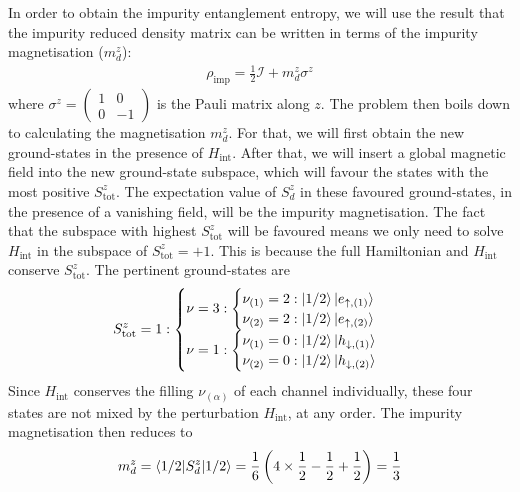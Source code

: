 \documentclass{revtex4-2}
\begin{document}
In order to obtain the impurity entanglement entropy, we will use the result that the impurity reduced density matrix can be written in terms of the impurity magnetisation (\(m_d^z\)):
\begin{equation}\begin{aligned}
	\rho_\text{imp} = \frac{1}{2}\mathcal{I} + m_d^z \sigma^z 
\end{aligned}\end{equation}
where \(\sigma^z = \begin{pmatrix} 1 & 0 \\ 0 & -1 \end{pmatrix} \) is the Pauli matrix along \(z\). The problem then boils down to calculating the magnetisation \(m_d^z\). For that, we will first obtain the new ground-states in the presence of \(H_\text{int}\). After that, we will insert a global magnetic field into the new ground-state subspace, which will favour the states with the most positive \(S_\text{tot}^z\). The expectation value of \(S_d^z\) in these favoured ground-states, in the presence of a vanishing field, will be the impurity magnetisation. The fact that the subspace with highest \(S_\text{tot}^z\) will be favoured means we only need to solve \(H_\text{int}\) in the subspace of \(S_\text{tot}^z = +1\). This is because the full Hamiltonian and \(H_\text{int}\) conserve \(S_\text{tot}^z\). The pertinent ground-states are
\begin{equation}\begin{aligned}
	S_\text{tot}^z = 1: \begin{cases}
	\nu=3: \begin{cases}
		\nu_{(1)}=2: \ket{1/2}\ket{e_{\uparrow, (1)}}\\
		\nu_{(2)}=2: \ket{1/2}\ket{e_{\uparrow, (2)}}\\
	\end{cases}\\
	\nu=1: \begin{cases}
		\nu_{(1)}=0: \ket{1/2}\ket{h_{\downarrow, (1)}}\\
		\nu_{(2)}=0: \ket{1/2}\ket{h_{\downarrow, (2)}}
	\end{cases}
	\end{cases} 
\end{aligned}\end{equation}
Since \(H_\text{int}\) conserves the filling \(\nu_{(\alpha)}\) of each channel individually, these four states are not mixed by the perturbation \(H_\text{int}\), at any order. The impurity magnetisation then reduces to
\begin{equation}\begin{aligned}
	m_d^z = \braket{1/2 | S_d^z | 1/2 } = \frac{1}{6}\left(4\times\frac{1}{2} - \frac{1}{2} + \frac{1}{2}\right) = \frac{1}{3}
\end{aligned}\end{equation}
\end{document}
